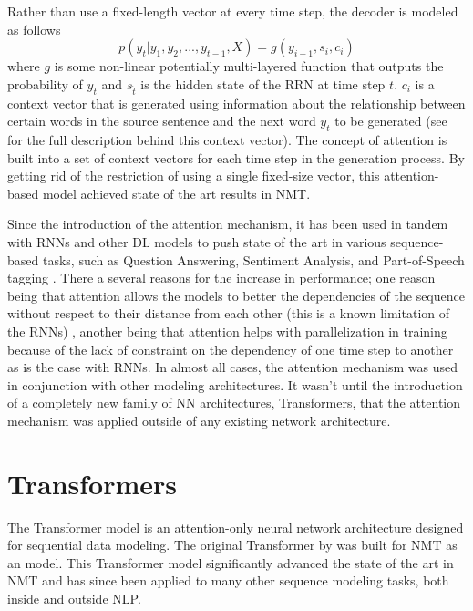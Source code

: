 Rather than use a fixed-length vector at every time step, the decoder is modeled as follows $$p(y_t \vert y_1, y_2, ..., y_{t-1}, X) = g(y_{i-1}, s_i, c_i)$$ where $g$ is some non-linear potentially multi-layered function that outputs the probability of $y_{t}$ and $s_{\hat{t}}$ is the hidden state of the RRN at time step $t$. $c_i$ is a context vector that is generated using information about the relationship between certain words in the source sentence and the next word $y_t$ to be generated (see \citet{bahdanau2014neural} for the full description behind this context vector). The concept of attention is built into a set of context vectors for each time step in the generation process. By getting rid of the restriction of using a single fixed-size vector, this attention-based model achieved state of the art results in NMT. 

Since the introduction of the attention mechanism, it has been used in tandem with RNNs and other DL models to push state of the art in various sequence-based tasks, such as Question Answering, Sentiment Analysis, and Part-of-Speech tagging \cite{chaudhari2019attentive}. There a several reasons for the increase in performance; one reason being that attention allows the models to better the dependencies of the sequence without respect to their distance from each other (this is a known limitation of the RNNs) \cite{vaswani2017attention}, another being that attention helps with parallelization in training because of the lack of constraint on the dependency of one time step to another as is the case with RNNs. In almost all cases, the attention mechanism was used in conjunction with other modeling architectures. It wasn't until the introduction of a completely new family of NN architectures, Transformers, that the attention mechanism was applied outside of any existing network architecture.


\section{Transformers}
The Transformer model is an attention-only neural network architecture designed for sequential data modeling. The original Transformer by \citet{vaswani2017attention} was built for NMT as an \ed{} model. This Transformer model significantly advanced the state of the art in NMT and has since been applied to many other sequence modeling tasks, both inside and outside NLP. 
\newcommand{\mb}[1]{\mathbf{#1}}

